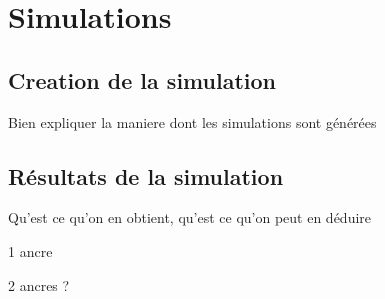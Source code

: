 \chapter{Simulations}

\section{Creation de la simulation}

Bien expliquer la maniere dont les simulations sont générées

\section{Résultats de la simulation}

Qu'est ce qu'on en obtient, qu'est ce qu'on peut en déduire

1 ancre

2 ancres ?
